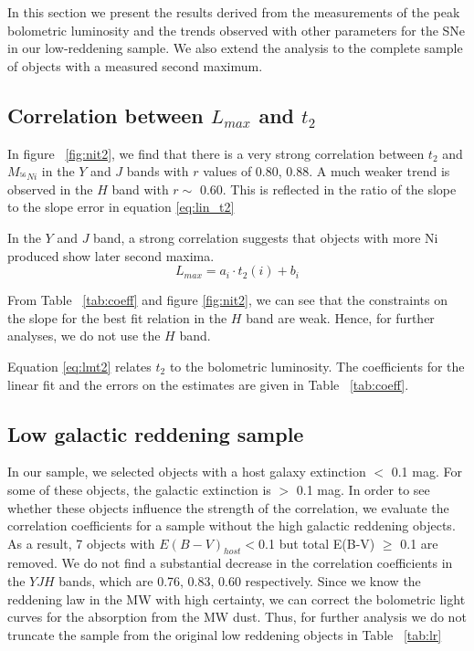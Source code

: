 In this section we present the results derived from the measurements of the peak bolometric luminosity and the trends observed with other parameters for the SNe in our low-reddening sample. We also extend the analysis to the complete sample of objects with a measured second maximum.



\subsection{Correlation between $L_{max}$ and $t_2$ }

In figure ~\ref{fig:nit2}, we find that there is a very strong correlation between $t_2$ and $M_{^{56}Ni}$ in the $Y$ and $J$ bands with $r$ values of 
0.80, 0.88. A much weaker trend is observed in the $H$ band with $r \sim$ 0.60. This is reflected in the ratio of the slope to the slope error in equation \eqref{eq:lin_t2}



In the $Y$ and $J$ band, a strong correlation suggests that objects with more Ni produced show later second maxima. 
\begin{equation}
\label{eq:lmt2}
L_{max}=a_i \cdot t_2(i) + b_i
\end{equation}

From Table ~\ref{tab:coeff} and figure \ref{fig:nit2}, we can see that the constraints on the slope for the best fit relation in the $H$ band are weak. Hence, for further analyses, we do not use the $H$ band.

Equation \eqref{eq:lmt2} relates $t_2$ to the bolometric luminosity. The coefficients for the linear fit and the errors on the estimates are given in Table ~\ref{tab:coeff}. 

\subsection{Low galactic reddening sample}
In our sample, we selected objects with a host galaxy extinction $<$ 0.1 mag. For some of these objects, the galactic extinction is $>$ 0.1 mag. In order to see whether these objects influence the strength of the correlation, we evaluate the correlation coefficients for a sample without the high galactic reddening objects.
 As a result, 7 objects with $E(B-V)_{host}<$0.1 but total E(B-V) $\geq$ 0.1 are removed. We do not find a substantial decrease in the correlation coefficients in the $YJH$ bands, which are 0.76, 0.83, 0.60 respectively. Since we know the reddening law in the MW with high certainty, we can correct the bolometric light curves for the absorption from the MW dust. Thus, for further analysis we do not truncate the sample from the original low reddening objects in Table ~\ref{tab:lr}




